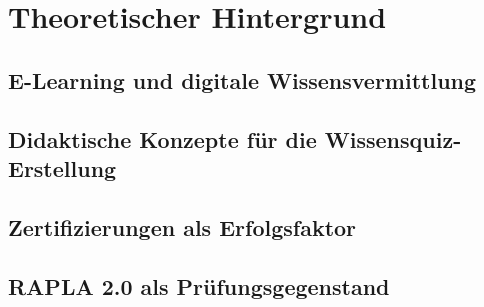 \chapter{Theoretischer Hintergrund}
\section{E-Learning und digitale Wissensvermittlung}
\section{Didaktische Konzepte für die Wissensquiz-Erstellung}
\section{Zertifizierungen als Erfolgsfaktor}
\section{RAPLA 2.0 als Prüfungsgegenstand}


